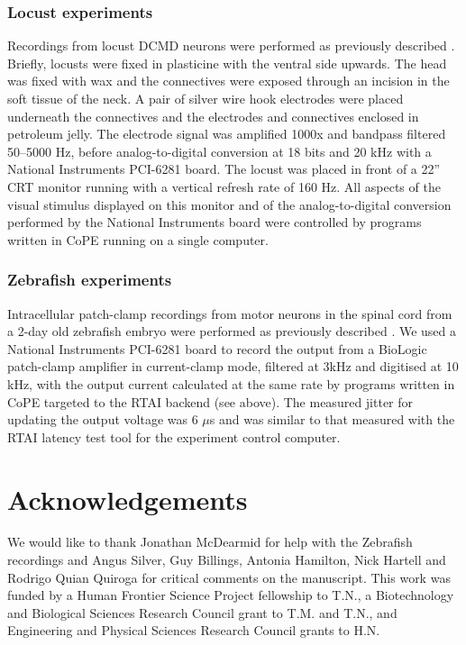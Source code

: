 \subsubsection*{Locust experiments}

Recordings from locust DCMD neurons were performed as previously
described \citep{Matheson2004}. Briefly, locusts were fixed in
plasticine with the ventral side upwards. The head was fixed with wax
and the connectives were exposed through an
incision in the soft tissue of the neck. A pair of silver wire hook
electrodes were placed underneath the connectives and the electrodes
and connectives enclosed in petroleum jelly. The electrode signal was
amplified 1000x and bandpass filtered 50--5000 Hz, before
analog-to-digital conversion at 18 bits and 20 kHz with a National
Instruments PCI-6281 board. The locust was placed in front of a 22''
CRT monitor running with a vertical refresh rate of 160 Hz. All
aspects of the visual stimulus displayed on this monitor and of
the analog-to-digital conversion performed by the National Instruments
board were controlled by programs written in 
CoPE running on a single computer.

\subsubsection*{Zebrafish experiments}

Intracellular patch-clamp recordings from motor neurons in the spinal
cord from a 2-day old zebrafish embryo were performed as previously
described \citep{McDearmid2006}. We used a National Instruments PCI-6281
board to
record the output from a BioLogic patch-clamp amplifier in
current-clamp mode, filtered at 3kHz and digitised at 10 kHz, with the
output current calculated at the same rate by programs written in
CoPE targeted to the RTAI backend (see
above). The measured jitter for updating the output voltage was 6
$\mu$s and was similar to that measured with the RTAI latency test
tool for the experiment control computer.

\section*{Acknowledgements} 

We would like to thank Jonathan McDearmid for help with the Zebrafish
recordings and Angus Silver, Guy Billings, Antonia Hamilton, Nick
Hartell and Rodrigo Quian Quiroga for critical comments on the
manuscript. This work was funded by a Human Frontier Science Project
fellowship to T.N., a Biotechnology and Biological Sciences Research
Council grant to T.M. and T.N., and Engineering and Physical Sciences Research
Council grants to H.N.

